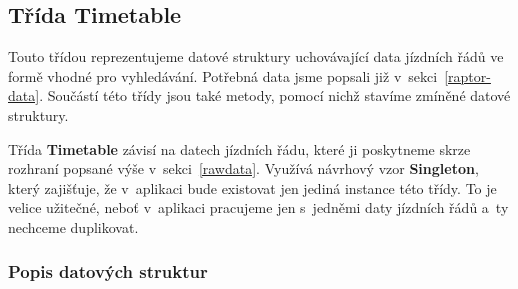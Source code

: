 \subsection{Třída Timetable}\label{class-timetable}

Touto třídou reprezentujeme datové struktury uchovávající data jízdních řádů ve formě vhodné pro vyhledávání. Potřebná data jsme popsali již v~sekci~\ref{raptor-data}. Součástí této třídy jsou také metody, pomocí nichž stavíme zmíněné datové struktury.

Třída \textbf{Timetable} závisí na datech jízdních řádu, které ji poskytneme skrze rozhraní popsané výše v~sekci~\ref{rawdata}. Využívá návrhový vzor \textbf{Singleton}, který zajišťuje, že v~aplikaci bude existovat jen jediná instance této třídy. To je velice užitečné, neboť v~aplikaci pracujeme jen s~jedněmi daty jízdních řádů a~ty nechceme duplikovat.

\subsubsection{Popis datových struktur}

